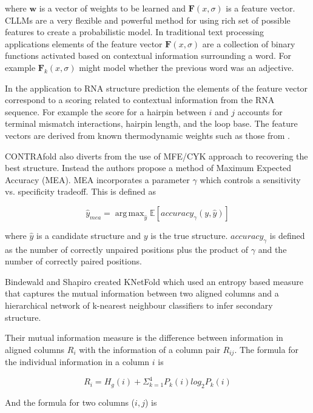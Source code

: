 \documentclass[journal]{IEEEtran}
\DeclareMathOperator*{\argmax}{arg\,max}
\begin{document}
where $\mathbf{w}$ is a vector of weights to be learned and $\mathbf{F}(x, \sigma)$ is a feature vector. CLLMs are a very flexible and powerful method for using rich set of possible features to create a probabilistic model. In traditional text processing applications elements of the feature vector $\mathbf{F}(x, \sigma)$ are a collection of binary functions activated based on contextual information surrounding a word. For example $\mathbf{F}_k(x, \sigma)$ might model whether the previous word was an adjective. 

In the application to RNA structure prediction the elements of the feature vector correspond to a scoring related to contextual information from the RNA sequence. For example the score for a hairpin between $i$ and $j$ accounts for terminal mismatch interactions, hairpin length, and the loop base. The feature vectors are derived from known thermodynamic weights such as those from \cite{mathews1999expanded}.

CONTRAfold also diverts from the use of MFE/CYK approach to recovering the best structure. Instead the authors propose a method of Maximum Expected Accuracy (MEA). MEA incorporates a parameter $\gamma$ which controls a sensitivity vs. specificity tradeoff. This is defined as

\begin{equation}
	\hat{y}_{mea} = \argmax_{\hat{y}} \mathbb{E}[accuracy_{\gamma}(y, \hat{y})]
\end{equation}

where $\hat{y}$ is a candidate structure and $y$ is the true structure. $accuracy_{\gamma}$ is defined as the number of correctly unpaired positions plus the product of $\gamma$ and the number of correctly paired positions. 

Bindewald and Shapiro \cite{bindewald2006rna} created KNetFold which used an entropy based measure that captures the mutual information between two aligned columns and a hierarchical network of k-nearest neighbour classifiers to infer secondary structure. 

Their mutual information measure is the difference between information in aligned columns $R_i$ with the information of a column pair $R_{ij}$. The formula for the individual information in a column $i$ is 
	
\begin{equation}
	R_i = H_g(i) + \Sigma_{k=1}^4 P_k(i) log_2 P_k(i)
\end{equation}

And the formula for two columns ($i, j$) is
\end{document}
